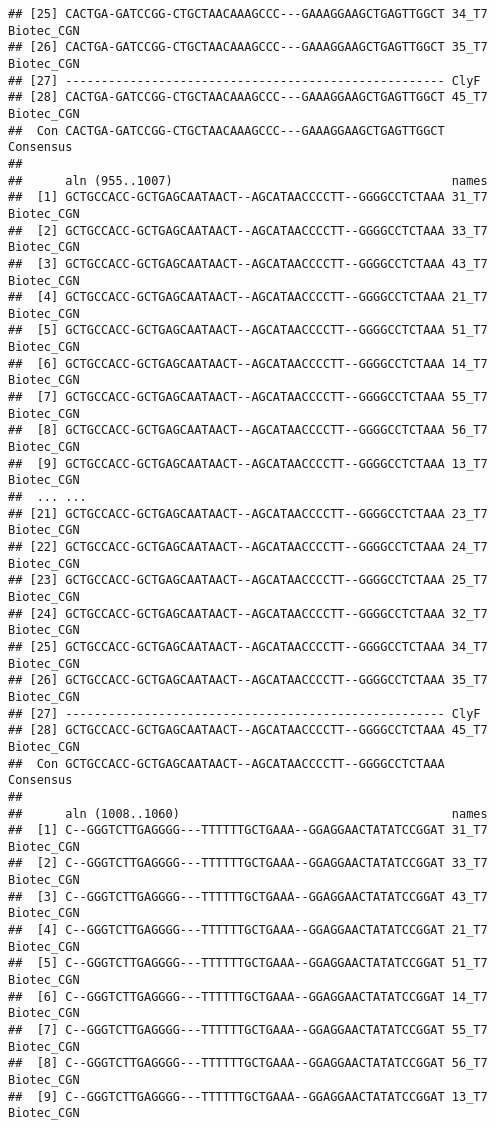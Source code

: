 \documentclass[
]{article}
\begin{document}
\begin{verbatim}
## [25] CACTGA-GATCCGG-CTGCTAACAAAGCCC---GAAAGGAAGCTGAGTTGGCT 34_T7 Biotec_CGN
## [26] CACTGA-GATCCGG-CTGCTAACAAAGCCC---GAAAGGAAGCTGAGTTGGCT 35_T7 Biotec_CGN
## [27] ----------------------------------------------------- ClyF
## [28] CACTGA-GATCCGG-CTGCTAACAAAGCCC---GAAAGGAAGCTGAGTTGGCT 45_T7 Biotec_CGN
##  Con CACTGA-GATCCGG-CTGCTAACAAAGCCC---GAAAGGAAGCTGAGTTGGCT Consensus 
## 
##      aln (955..1007)                                       names
##  [1] GCTGCCACC-GCTGAGCAATAACT--AGCATAACCCCTT--GGGGCCTCTAAA 31_T7 Biotec_CGN
##  [2] GCTGCCACC-GCTGAGCAATAACT--AGCATAACCCCTT--GGGGCCTCTAAA 33_T7 Biotec_CGN
##  [3] GCTGCCACC-GCTGAGCAATAACT--AGCATAACCCCTT--GGGGCCTCTAAA 43_T7 Biotec_CGN
##  [4] GCTGCCACC-GCTGAGCAATAACT--AGCATAACCCCTT--GGGGCCTCTAAA 21_T7 Biotec_CGN
##  [5] GCTGCCACC-GCTGAGCAATAACT--AGCATAACCCCTT--GGGGCCTCTAAA 51_T7 Biotec_CGN
##  [6] GCTGCCACC-GCTGAGCAATAACT--AGCATAACCCCTT--GGGGCCTCTAAA 14_T7 Biotec_CGN
##  [7] GCTGCCACC-GCTGAGCAATAACT--AGCATAACCCCTT--GGGGCCTCTAAA 55_T7 Biotec_CGN
##  [8] GCTGCCACC-GCTGAGCAATAACT--AGCATAACCCCTT--GGGGCCTCTAAA 56_T7 Biotec_CGN
##  [9] GCTGCCACC-GCTGAGCAATAACT--AGCATAACCCCTT--GGGGCCTCTAAA 13_T7 Biotec_CGN 
##  ... ...
## [21] GCTGCCACC-GCTGAGCAATAACT--AGCATAACCCCTT--GGGGCCTCTAAA 23_T7 Biotec_CGN
## [22] GCTGCCACC-GCTGAGCAATAACT--AGCATAACCCCTT--GGGGCCTCTAAA 24_T7 Biotec_CGN
## [23] GCTGCCACC-GCTGAGCAATAACT--AGCATAACCCCTT--GGGGCCTCTAAA 25_T7 Biotec_CGN
## [24] GCTGCCACC-GCTGAGCAATAACT--AGCATAACCCCTT--GGGGCCTCTAAA 32_T7 Biotec_CGN
## [25] GCTGCCACC-GCTGAGCAATAACT--AGCATAACCCCTT--GGGGCCTCTAAA 34_T7 Biotec_CGN
## [26] GCTGCCACC-GCTGAGCAATAACT--AGCATAACCCCTT--GGGGCCTCTAAA 35_T7 Biotec_CGN
## [27] ----------------------------------------------------- ClyF
## [28] GCTGCCACC-GCTGAGCAATAACT--AGCATAACCCCTT--GGGGCCTCTAAA 45_T7 Biotec_CGN
##  Con GCTGCCACC-GCTGAGCAATAACT--AGCATAACCCCTT--GGGGCCTCTAAA Consensus 
## 
##      aln (1008..1060)                                      names
##  [1] C--GGGTCTTGAGGGG---TTTTTTGCTGAAA--GGAGGAACTATATCCGGAT 31_T7 Biotec_CGN
##  [2] C--GGGTCTTGAGGGG---TTTTTTGCTGAAA--GGAGGAACTATATCCGGAT 33_T7 Biotec_CGN
##  [3] C--GGGTCTTGAGGGG---TTTTTTGCTGAAA--GGAGGAACTATATCCGGAT 43_T7 Biotec_CGN
##  [4] C--GGGTCTTGAGGGG---TTTTTTGCTGAAA--GGAGGAACTATATCCGGAT 21_T7 Biotec_CGN
##  [5] C--GGGTCTTGAGGGG---TTTTTTGCTGAAA--GGAGGAACTATATCCGGAT 51_T7 Biotec_CGN
##  [6] C--GGGTCTTGAGGGG---TTTTTTGCTGAAA--GGAGGAACTATATCCGGAT 14_T7 Biotec_CGN
##  [7] C--GGGTCTTGAGGGG---TTTTTTGCTGAAA--GGAGGAACTATATCCGGAT 55_T7 Biotec_CGN
##  [8] C--GGGTCTTGAGGGG---TTTTTTGCTGAAA--GGAGGAACTATATCCGGAT 56_T7 Biotec_CGN
##  [9] C--GGGTCTTGAGGGG---TTTTTTGCTGAAA--GGAGGAACTATATCCGGAT 13_T7 Biotec_CGN 

\end{verbatim}
\end{document}
